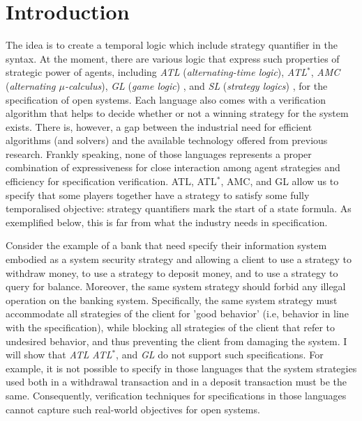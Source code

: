\chapter{Introduction}
\label{c:intro}

The idea is to create a temporal logic which include strategy quantifier in the syntax.
At the moment, there are various logic that express such properties of strategic power of agents,
including {\em ATL} ({\em alternating-time logic}), 
{\em ATL}$^*$, {\em AMC} ({\em alternating $\mu$-calculus}),
{\em GL} ({\em game logic}) \cite{AHK02}, 
and {\em SL} ({\em strategy logics}) \cite{CLM10,CHP10,MMV10}, 
for the specification of open systems.  
Each language also comes with a verification algorithm that helps to decide whether or not a winning strategy for the system exists.
There is, however, a gap between the industrial need for efficient algorithms (and solvers) and the available technology offered from previous research.
Frankly speaking, none of those languages represents a proper combination of expressiveness for close interaction among agent strategies and efficiency for specification verification.  
ATL, ATL$^*$, AMC, and GL \cite{AHK02} allow us to specify that some players together have a strategy to satisfy some fully temporalised objective: strategy quantifiers mark the start of a state formula.
As exemplified below, this is far from\label{reply1.falls.short.far.from} what the industry needs in specification.  

Consider the example of a bank that need specify their information system embodied as a system security strategy and allowing a client to use a strategy to withdraw money, to use a strategy to deposit money, and to use a strategy to query for balance.
Moreover, the same system strategy should forbid any illegal operation on the banking system.  
Specifically, the same system strategy must accommodate all strategies of the client for 'good behavior' (i.e, behavior in line with the specification), while blocking all strategies of the client that refer to undesired behavior, and thus preventing the client from damaging the system.
I will show that 
{\em ATL} %
{\em ATL}$^*$, %
and 
{\em GL} %
\cite{AHK02}  
do not support such specifications.  
For example, it is not possible to specify in those languages that 
the system strategies used both in a withdrawal transaction and 
in a deposit transaction must be the same.  
Consequently, verification techniques for specifications in those languages 
cannot capture such real-world objectives for open systems.  

